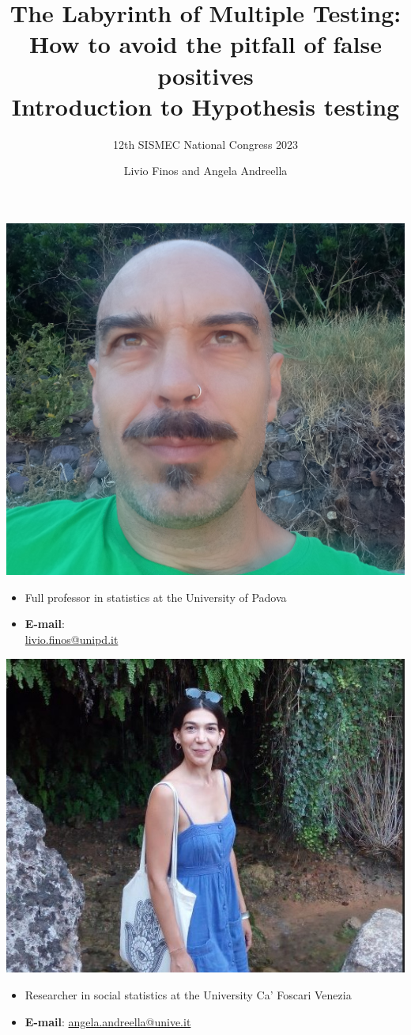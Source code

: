 \documentclass[xcolor={dvipsnames}]{beamer}
\title[]{The Labyrinth of Multiple Testing: How to avoid the pitfall of false positives \\
\vspace*{1cm} \large Introduction to Hypothesis testing}
\subtitle{\vspace*{2cm} \small 12th SISMEC National Congress 2023}
\date{}
\author[\hspace{5cm}]{Livio Finos and Angela Andreella}
\begin{document}
\begin{frame}
  \titlepage
\end{frame}

\begin{frame}
    \begin{minipage}[t]{0.45\textwidth}
    \centering
\includegraphics[width= .85\textwidth]{Slides/MTP/plaatjes/Finos.jpg}
\begin{itemize}
    \item Full professor in statistics at the University of Padova
    \item \textbf{E-mail}: \\ \href{mailto:livio.finos@unipd.it}{livio.finos@unipd.it} 
\end{itemize}

\end{minipage}\hfill
\begin{minipage}[t]{0.45\textwidth}
\centering
  \includegraphics[width= .95\textwidth]{Slides/MTP/plaatjes/Andreella.jpg}
\begin{itemize}
    \item Researcher in social statistics at the University Ca' Foscari Venezia
    \item \textbf{E-mail}: \href{mailto:angela.andreella@unive.it}{angela.andreella@unive.it} 
\end{itemize}


\end{minipage}
\end{frame}
\end{document}
